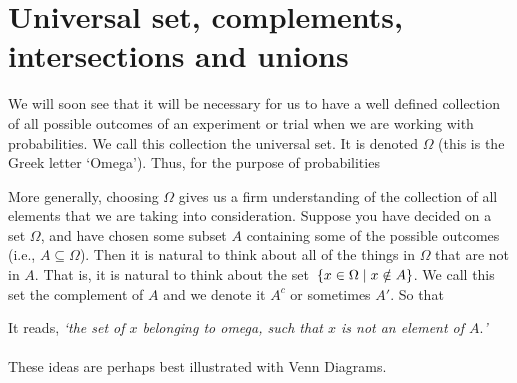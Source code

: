 
\section{Universal set, complements, intersections and unions}
We will soon see that it will be necessary for us to have a well defined collection of all possible outcomes of an experiment or trial when we are working with probabilities. We call this collection the universal set. It is denoted $\Omega$ \label{symbOmega} (this is the Greek letter `Omega'). Thus, for the purpose of probabilities \label{omega}\label{universal set}
	\bigskip
	
	\hfil{}
	\bigskip

\noindent More generally, choosing $\Omega$ gives us a firm understanding of the collection of all elements that we are taking into consideration. Suppose you have decided on a set $\Omega$, and have chosen some subset $A$ containing some of the possible outcomes (i.e., $A \subseteq \Omega$). Then it is natural to think about all of the things in $\Omega$ that are not in $A$. That is, it is natural to think about the set~$\left\{x \in \Omega \mid x \notin A\right\}$. We call this set the complement \label{complement} of $A$ and we denote it $A^c$ \label{symbcomplement} or sometimes $A'$. So that
	\bigskip
	
	\hfil{}
	\bigskip

\noindent It reads, \textit{`the set of $x$ belonging to omega, such that $x$ is not an element of $A.$'} \\ \\
These ideas are perhaps best illustrated with Venn Diagrams. 
	\begin{figure}[h!]
	\centering
	\end{figure}

